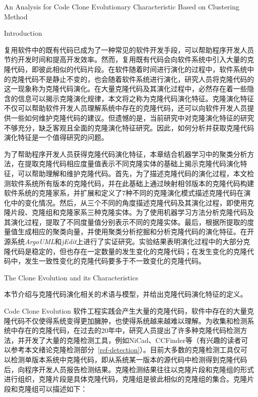 
{An Analysis for Code Clone Evolutionary Characteristic Based on Clustering Method}

{Introduction}

复用软件中的既有代码已成为了一种常见的软件开发手段，可以帮助程序开发人员节约开发时间和提高开发效率。然而，复用既有代码会向软件系统中引入大量的克隆代码，即彼此相似的代码片段。在软件随着时间进行演化的过程中，软件系统中的克隆代码不是静止不变的，也会随着软件系统进行演化，研究人员将克隆代码的这一现象称为克隆代码演化。在大量克隆代码及其演化过程中，必然存在着一些隐含的信息可以揭示克隆演化规律，本文将之称为克隆代码演化特征。克隆演化特征不仅可以帮助软件开发人员理解系统中存在的克隆代码，还可以向软件开发人员提供一些如何维护克隆代码的建议。但遗憾的是，当前研究中对克隆演化特征的研究不够充分，缺乏客观且全面的克隆演化特征研究。因此，如何分析并获取克隆代码演化特征是一个值得研究的问题。

为了帮助程序开发人员获得克隆代码演化特征，本章结合机器学习中的聚类分析方法，在提取克隆代码相应度量值表示不同克隆实体的基础上揭示克隆代码演化特征，可以帮助理解和维护克隆代码。首先，为了描述克隆代码的演化过程，本文检测软件系统所有版本的克隆代码，并在此基础上通过映射相邻版本的克隆代码构建软件系统的克隆家系，并扩展和定义了7种不同的克隆演化模式描述克隆代码在演化中的变化情况。然后，从三个不同的角度描述克隆代码及其演化过程，即使用克隆片段、克隆组和克隆家系三种克隆实体。为了使用机器学习方法分析克隆代码及其演化过程，提取了不同度量值分别表示不同的克隆实体。最后，根据所提取的度量值生成相应的聚类向量，并使用聚类分析挖掘和分析克隆代码的演化特征。在开源系统{\em ArgoUML}和{\em jEdit}上进行了实证研究。实验结果表明演化过程中的大部分克隆代码是稳定的，但也存在一定数量的发生变化的克隆代码；在发生变化的克隆代码中，发生一致性变化的克隆代码要多于不一致变化的克隆代码。

{The Clone Evolution and its Characteristics}

本节介绍与克隆代码演化相关的术语与模型，并给出克隆代码演化特征的定义。

{Code Clone Evolution}
\label{lab-evolution}
软件工程实践会产生大量的克隆代码，软件中存在的大量克隆代码不仅使得系统变得更加臃肿，也使得系统越来越难以理解。为收集和检测系统中存在的克隆代码，在过去的20年中，研究人员提出了许多种克隆代码检测方法，并开发了大量的克隆检测工具，例如NiCad\cite{roy2008nicad}、CCFinder\cite{kamiya2002ccfinder}等（有兴趣的读者可以参考本文绪论克隆检测部分~\ref{ref-detection}）。目前大多数的克隆检测工具仅可以检测单版本系统中克隆代码，即从系统某一版本的源代码中检测得到克隆代码后，向程序开发人员报告检测结果。克隆检测结果往往以克隆片段和克隆组的形式进行组织，克隆片段是具体克隆代码，克隆组是彼此相似的克隆组的集合。克隆片段和克隆组可以描述如下：\\


